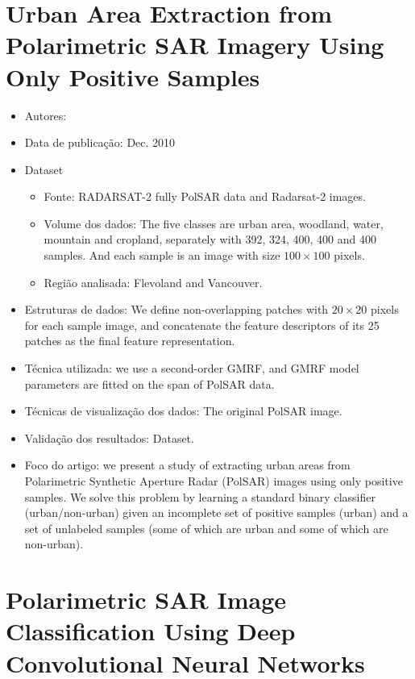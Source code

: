\documentclass[paper=a4, fontsize=11pt]{scrartcl}
\begin{document}
\newpage

\section*{Urban Area Extraction from Polarimetric SAR Imagery Using Only Positive Samples}

\begin{itemize}
    \item Autores:~\cite{liu2010urban}
    \item Data de publicação: Dec. 2010
    \item Dataset
    \begin{itemize}
        \item Fonte: RADARSAT-2 fully PolSAR data and Radarsat-2 images.
        \item Volume dos dados: The five classes are urban area, woodland, water, mountain and cropland, separately with 392, 324, 400, 400 and 400 samples. And each
sample is an image with size $100 \times 100$ pixels.
        \item Região analisada: Flevoland and Vancouver.
    \end{itemize}
    \item Estruturas de dados: We define non-overlapping patches with $20 \times 20$ pixels for each sample image, and concatenate the feature descriptors of its 25 patches as the final feature representation.
    \item Técnica utilizada: we use a second-order GMRF, and GMRF model parameters are fitted on the span of PolSAR data.
    \item Técnicas de visualização dos dados: The original PolSAR image.
    \item Validação dos resultados: Dataset.
    \item Foco do artigo: we present a study of extracting urban areas from Polarimetric Synthetic Aperture Radar (PolSAR) images using only positive samples. We solve this problem by learning a standard binary classifier (urban/non-urban) given an incomplete set of positive samples (urban) and a set of unlabeled samples (some of which are urban and some of which are non-urban).
\end{itemize}

\newpage

\section*{Polarimetric SAR Image Classification Using Deep Convolutional Neural Networks}
\end{document}
